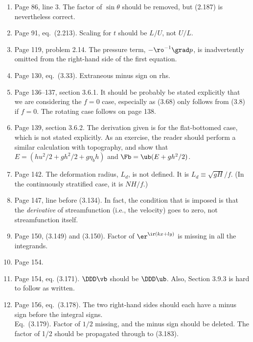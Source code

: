\documentclass[10pt]{article}
\newcommand{\eq}{eq.\ } \newcommand{\Eq}{Eq.\ }
\begin{document}
\begin{enumerate}
\item Page 86, line 3. The factor of $\sin \theta$ should be removed, but (2.187) is nevertheless correct.

\item Page 91, \eq (2.213). Scaling for $t$ should be $L/U$, not $U/L$.

\item Page 119, problem 2.14. The pressure term, $-\ro^{-1} \grad p$, is inadvertently omitted from the right-hand side of the first equation. 

\item Page 130, \eq (3.33). Extraneous minus sign on rhs.

\item Page 136--137, section 3.6.1. It should be probably be stated explicitly that we are considering the $f=0$ case, especially as (3.68) only follows from (3.8) if $f=0$. The rotating case follows on page 138. 

\item Page 139, section 3.6.2. The derivation given is for the flat-bottomed case, which is not stated explicitly. As an exercise, the reader should perform a similar calculation with topography, and show that $E = (h u^2/2 + g h^2/2 + g \eta_b h)$ and $\Fb = \ub( E + g h^2/2)$.  

\item Page 142. The deformation radius, $L_d$, is not defined. It is $L_d \equiv \sqrt{gH}/f$. (In the continuously stratified case, it is $NH/f$.)

\item Page 147, line before (3.134). In fact, the condition that is imposed is that the \emph{derivative} of streamfunction (i.e., the velocity) goes to zero, not streamfunction itself. 

\item Page 150, (3.149) and (3.150). Factor of $\er^{\ir (kx + ly)}$ is missing in all the integrands. 

\item Page 154. \item Page 154, eq. (3.171). $\DDD \vb$ should be $\DDD \ub$. Also, 
Section 3.9.3 is hard to follow as written.

\item Page 156, \eq (3.178). The two right-hand sides should each have a minus sign before the integral signs. \\
\Eq (3.179). Factor of $1/2$ missing, and the minus sign should be deleted. The factor of 1/2 should be propagated through to (3.183). 


\end{enumerate}
\end{document}
